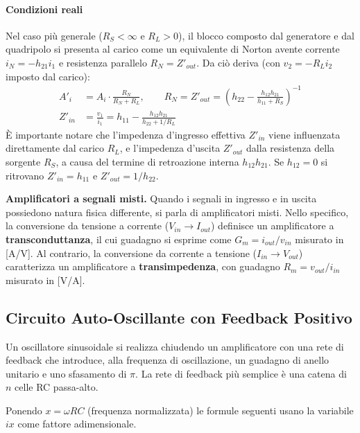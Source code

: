 \paragraph{Condizioni reali}
Nel caso più generale ($R_S < \infty$ e $R_L > 0$), il blocco composto dal generatore e dal quadripolo si presenta al carico come un equivalente di Norton avente corrente $i_N = -h_{21}i_1$ e resistenza parallelo $R_N = Z'_{out}$.
Da ciò deriva (con $v_2 = -R_L i_2$ imposto dal carico):
\begin{align}
    A'_i &= A_i \cdot \frac{R_N}{R_N + R_L}, \qquad R_N = Z'_{out} = \left(h_{22} - \frac{h_{12}h_{21}}{h_{11} + R_S}\right)^{-1} \\
    Z'_{in} &= \frac{v_1}{i_1} = h_{11} - \frac{h_{12}h_{21}}{h_{22} + 1/R_L}
\end{align}
È importante notare che l'impedenza d'ingresso effettiva $Z'_{in}$ viene influenzata direttamente dal carico $R_L$, e l'impedenza d'uscita $Z'_{out}$ dalla resistenza della sorgente $R_S$, a causa del termine di retroazione interna $h_{12}h_{21}$. Se $h_{12} = 0$ si ritrovano $Z'_{in} = h_{11}$ e $Z'_{out} = 1/h_{22}$.

\medskip\noindent\textbf{Amplificatori a segnali misti.} Quando i segnali in ingresso e in uscita possiedono natura fisica differente, si parla di amplificatori misti. Nello specifico, la conversione da tensione a corrente ($V_{in} \to I_{out}$) definisce un amplificatore a \textbf{transconduttanza}, il cui guadagno si esprime come $G_m = i_{out}/v_{in}$ misurato in [A/V]. Al contrario, la conversione da corrente a tensione ($I_{in} \to V_{out}$) caratterizza un amplificatore a \textbf{transimpedenza}, con guadagno $R_m = v_{out}/i_{in}$ misurato in [V/A].

\subsection{Circuito Auto-Oscillante con Feedback Positivo}
Un oscillatore sinusoidale si realizza chiudendo un amplificatore con una rete di feedback che introduce, alla frequenza di oscillazione, un guadagno di anello unitario e uno sfasamento di $\pi$. La rete di feedback più semplice è una catena di $n$ celle RC passa-alto.

Ponendo $x = \omega RC$ (frequenza normalizzata) le formule seguenti usano la variabile $ix$ come fattore adimensionale.

